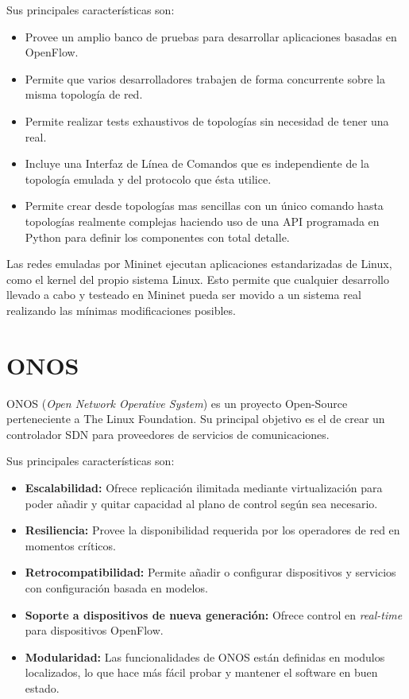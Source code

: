 Sus principales características son:
\begin{itemize}
	\item Provee un amplio banco de pruebas para desarrollar aplicaciones basadas en OpenFlow.
	\item Permite que varios desarrolladores trabajen de forma concurrente sobre la misma topología de red.
	\item Permite realizar tests exhaustivos de topologías sin necesidad de tener una real.
	\item Incluye una Interfaz de Línea de Comandos que es independiente de la topología emulada y del protocolo que ésta utilice.
	\item Permite crear desde topologías mas sencillas con un único comando hasta topologías realmente complejas haciendo uso de una API programada en Python para definir los componentes con total detalle.
\end{itemize}

Las redes emuladas por Mininet ejecutan aplicaciones estandarizadas de Linux, como el kernel del propio sistema Linux. Esto permite que cualquier desarrollo llevado a cabo y testeado en Mininet pueda ser movido a un sistema real realizando las mínimas modificaciones posibles.

\section{ONOS}
\label{sec:onos}

ONOS (\textit{Open Network Operative System})\cite{onosbib} es un proyecto Open-Source perteneciente a The Linux Foundation. Su principal objetivo es el de crear un controlador SDN para proveedores de servicios de comunicaciones.

Sus principales características son:
\begin{itemize}
	\item \textbf{Escalabilidad:} Ofrece replicación ilimitada mediante virtualización para poder añadir y quitar capacidad al plano de control según sea necesario.
	\item \textbf{Resiliencia:} Provee la disponibilidad requerida por los operadores de red en momentos críticos.
	\item \textbf{Retrocompatibilidad:} Permite añadir o configurar dispositivos y servicios con configuración basada en modelos.
	\item \textbf{Soporte a dispositivos de nueva generación:} Ofrece control en \textit{real-time} para dispositivos OpenFlow.
	\item \textbf{Modularidad:} Las funcionalidades de ONOS están definidas en modulos localizados, lo que hace más fácil probar y mantener el software en buen estado.
\end{itemize}



